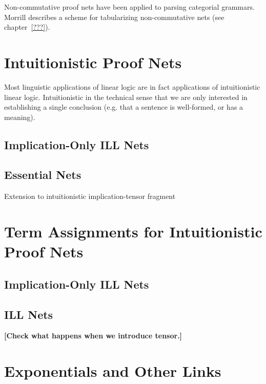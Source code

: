Non-commutative proof nets have been applied to parsing categorial grammars.
Morrill describes a scheme for tabularizing non-commutative nets (see
chapter~\ref{???}).


\section{Intuitionistic Proof Nets}
Most linguistic applications of linear logic are in fact applications of
intuitionistic linear logic.  Intuitionistic in the technical sense that we
are only interested in establishing a single conclusion (e.g. that a sentence
is well-formed, or has a meaning).

\subsection{Implication-Only ILL Nets}

\subsection{Essential Nets}
Extension to intuitionistic implication-tensor fragment



\section{Term Assignments for Intuitionistic Proof Nets}

\subsection{Implication-Only ILL Nets}

\subsection{ILL Nets}
{\bf [Check what happens when we introduce tensor.]}

\section{Exponentials and Other Links}
